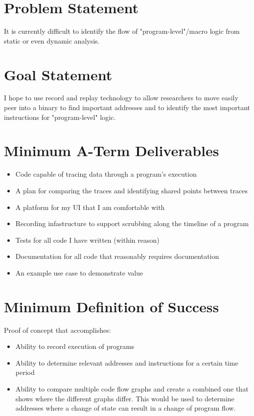 \maketitle

\section{Problem Statement}

It is currently difficult to identify the flow of "program-level"/macro logic from static or even dynamic analysis. 

\section{Goal Statement}

I hope to use record and replay technology to allow researchers to move easily peer into a binary to find important addresses and to identify the most important instructions for "program-level" logic.

\section{Minimum A-Term Deliverables}

\begin{itemize}
    \item Code capable of tracing data through a program's execution 
    \item A plan for comparing the traces and identifying shared points between traces
    \item A platform for my UI that I am comfortable with
    \item Recording infastructure to support scrubbing along the timeline of a program
    \item Tests for all code I have written (within reason)
    \item Documentation for all code that reasonably requires documentation 
    \item An example use case to demonstrate value
\end{itemize}

\section{Minimum Definition of Success}
Proof of concept that accomplishes:
\begin{itemize}
    \item Ability to record execution of programs
    \item Ability to determine relevant addresses and instructions for a certain time period
    \item Ability to compare multiple code flow graphs and create a combined one that shows where the different graphs differ. This would be used to determine addresses where a change of state can result in a change of program flow.
\end{itemize}

